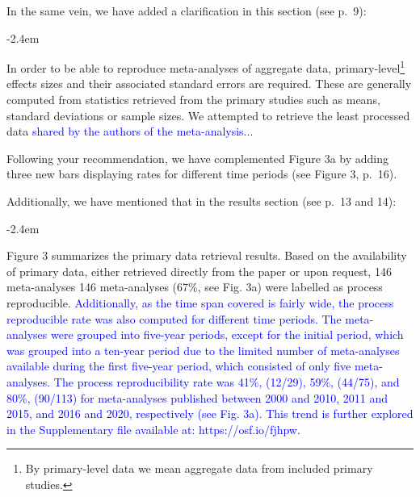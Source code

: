 \documentclass[draft]{article}
\renewenvironment{quote}{\begin{fquote}\advance\leftmargini -2.4em\begin{oldquote}}{\end{oldquote}\end{fquote}}
\newenvironment{fquote}
  {\def\FrameCommand{
	\fboxsep=0.6em %
	\fcolorbox{black}{white}}%
    \MakeFramed {\advance\hsize-2\width \FrameRestore}
    \begin{minipage}{\linewidth}
  }
  {\end{minipage}\endMakeFramed}
\begin{document}
In the same vein, we have added a clarification in this section (see p.~9):

\begin{quote}
In order to be able to reproduce meta-analyses of aggregate data, primary-level\footnote{By primary-level data we mean aggregate data from included primary studies.} effects sizes and their associated standard errors are required. These are generally computed from statistics retrieved from the primary studies such as means, standard deviations or sample sizes. We attempted to retrieve the least processed data \textcolor{blue}{shared by the authors of the meta-analysis...}
\end{quote}


Following your recommendation, we have complemented Figure 3a by adding three new bars displaying rates for different time periods (see Figure 3, p.~16).

Additionally, we have mentioned that in the results section (see p.~13 and 14):

\begin{quote}
Figure 3 summarizes the primary data retrieval results. Based on the availability of primary data, either retrieved directly from the paper or upon request, 146 meta-analyses 146 meta-analyses (67\%, see Fig. 3a) were labelled as process reproducible. \textcolor{blue}{Additionally, as the time span covered is fairly wide, the process reproducible rate was also computed for different time periods. The meta-analyses were grouped into five-year periods, except for the initial period, which was grouped into a ten-year period due to the limited number of meta-analyses available during the first five-year period, which consisted of only five meta-analyses. The process reproducibility rate was 41\%, (12/29), 59\%, (44/75), and 80\%, (90/113) for meta-analyses published between 2000 and 2010, 2011 and 2015, and 2016 and 2020, respectively (see Fig. 3a). This trend is further explored in the Supplementary file available at: https://osf.io/fjhpw.}
\end{quote}
\end{document}
